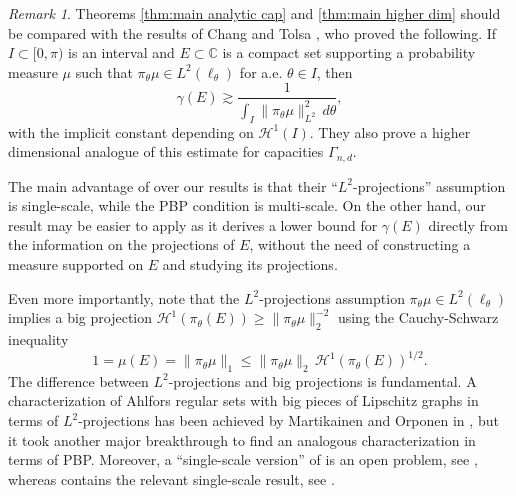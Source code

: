 \documentclass[11pt,reqno]{amsart}
\newcommand{\fr}[2]{\frac{#1}{#2}}
\theoremstyle{definition}
\theoremstyle{remark}
\newtheorem{remark}[theorem]{Remark}
\numberwithin{equation}{section}
\newcommand{\dH}{\mathcal{H}}
\theoremstyle{theorem}
\theoremstyle{definition}
\theoremstyle{remark}
\numberwithin{equation}{section}
\begin{document}
	\begin{remark}\label{rem:CT}
		Theorems \ref{thm:main analytic cap} and \ref{thm:main higher dim} should be compared with the results of Chang and Tolsa \cite{chang2017analytic}, who proved the following. If $I\subset [0,\pi)$ is an interval and $E\subset\mathbb{C}$ is a compact set supporting a probability measure $\mu$ such that $\pi_\theta\mu\in L^2(\ell_\theta)$ for a.e. $\theta\in I$, then 
		\begin{equation*}
		\gamma(E)\gtrsim \fr{1}{\int_I \|\pi_\theta\mu\|^2_{L^2}\, d\theta},
		\end{equation*}
		with the implicit constant depending on $\dH^1(I)$. They also prove a higher dimensional analogue of this estimate for capacities $\Gamma_{n,d}$.
		
		The main advantage of \cite{chang2017analytic} over our results is that their ``$L^2$-projections'' assumption is single-scale, while the PBP condition is multi-scale. On the other hand, our result may be easier to apply as it derives a lower bound for $\gamma(E)$ directly from the information on the projections of $E$, without the need of constructing a measure supported on $E$ and studying its projections. 
		
		Even more importantly, note that the $L^2$-projections assumption $\pi_\theta\mu\in L^2(\ell_\theta)$ implies a big projection $\dH^1(\pi_\theta(E))\ge\|\pi_\theta\mu\|^{-2}_{2}$ using the Cauchy-Schwarz inequality
		\begin{equation*}
		1 = \mu(E) = \|\pi_\theta\mu\|_{1} \le \|\pi_\theta\mu\|_{2}\,\dH^1(\pi_\theta(E))^{1/2}.
		\end{equation*}		
		The difference between $L^2$-projections and big projections is fundamental. A characterization of Ahlfors regular sets with big pieces of Lipschitz graphs in terms of $L^2$-projections has been achieved by Martikainen and Orponen in \cite{martikainen2018characterising}, but it took another major breakthrough \cite{orponen2020plenty} to find an analogous characterization in terms of PBP. Moreover, a ``single-scale version'' of \cite{orponen2020plenty} is an open problem, see \cite[\S1.3]{orponen2020plenty}, whereas \cite{martikainen2018characterising} contains the relevant single-scale result, see \cite[Theorem 1.7]{martikainen2018characterising}.
	\end{remark} 
	
\end{document}
